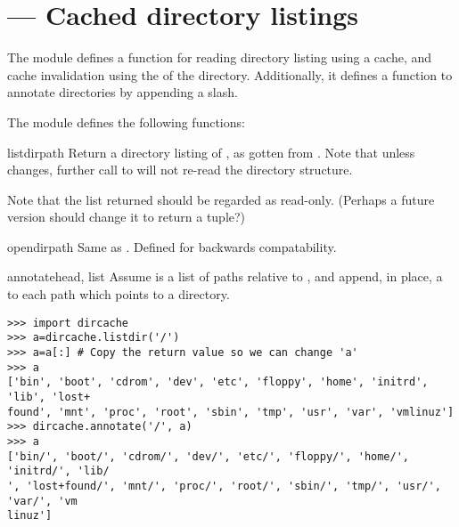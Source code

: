 \section{ ---
         Cached directory listings}


The  module defines a function for reading directory listing
using a cache, and cache invalidation using the  of the directory.
Additionally, it defines a function to annotate directories by appending
a slash.

The  module defines the following functions:

\begin{funcdesc}{listdir}{path}
Return a directory listing of , as gotten from
. Note that unless  changes, further call
to  will not re-read the directory structure.

Note that the list returned should be regarded as read-only. (Perhaps
a future version should change it to return a tuple?)
\end{funcdesc}

\begin{funcdesc}{opendir}{path}
Same as . Defined for backwards compatability.
\end{funcdesc}

\begin{funcdesc}{annotate}{head, list}
Assume  is a list of paths relative to , and append,
in place, a \character{/} to each path which points to a directory.
\end{funcdesc}

\begin{verbatim}
>>> import dircache
>>> a=dircache.listdir('/')
>>> a=a[:] # Copy the return value so we can change 'a'
>>> a
['bin', 'boot', 'cdrom', 'dev', 'etc', 'floppy', 'home', 'initrd', 'lib', 'lost+
found', 'mnt', 'proc', 'root', 'sbin', 'tmp', 'usr', 'var', 'vmlinuz']
>>> dircache.annotate('/', a)
>>> a
['bin/', 'boot/', 'cdrom/', 'dev/', 'etc/', 'floppy/', 'home/', 'initrd/', 'lib/
', 'lost+found/', 'mnt/', 'proc/', 'root/', 'sbin/', 'tmp/', 'usr/', 'var/', 'vm
linuz']
\end{verbatim}
